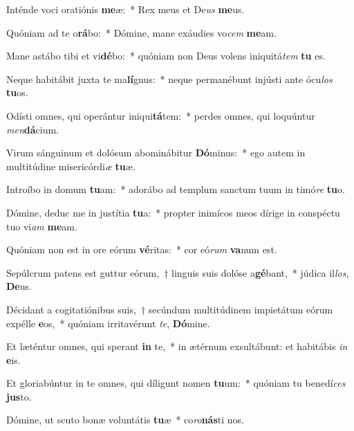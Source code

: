 \item Inténde voci oratiónis \textbf{me}æ:~* Rex meus et De\textit{us} \textbf{me}us.
\item Quóniam ad te o\textbf{rá}bo:~* Dómine, mane exáudies vo\textit{cem} \textbf{me}am.
\item Mane astábo tibi et vi\textbf{dé}bo:~* quóniam non Deus volens iniquitá\textit{tem} \textbf{tu} es.
\item Neque habitábit juxta te ma\textbf{lí}gnus:~* neque permanébunt injústi ante ócu\textit{los} \textbf{tu}os.
\item Odísti omnes, qui operántur iniqui\textbf{tá}tem:~* perdes omnes, qui loquúntur \textit{men}\textbf{dá}cium.
\item Virum sánguinum et dolósum abominábitur \textbf{Dó}minus:~* ego autem in multitúdine misericórdi\textit{æ} \textbf{tu}æ.
\item Introíbo in domum \textbf{tu}am:~* adorábo ad templum sanctum tuum in timó\textit{re} \textbf{tu}o.
\item Dómine, deduc me in justítia \textbf{tu}a:~* propter inimícos meos dírige in conspéctu tuo vi\textit{am} \textbf{me}am.
\item Quóniam non est in ore eórum \textbf{vé}ritas:~* cor eó\textit{rum} \textbf{va}num est.
\item Sepúlcrum patens est guttur eórum,~† linguis suis dolóse a\textbf{gé}bant,~* júdica il\textit{los}, \textbf{De}us.
\item Décidant a cogitatiónibus suis,~† secúndum multitúdinem impietátum eórum expélle \textbf{e}os,~* quóniam irritavérunt \textit{te}, \textbf{Dó}mine.
\item Et læténtur omnes, qui sperant \textbf{in} te,~* in ætérnum exsultábunt: et habitábis \textit{in} \textbf{e}is.
\item Et gloriabúntur in te omnes, qui díligunt nomen \textbf{tu}um:~* quóniam tu benedí\textit{ces} \textbf{jus}to.
\item Dómine, ut scuto bonæ voluntátis \textbf{tu}æ~* co\textit{ro}\textbf{nás}ti nos.
